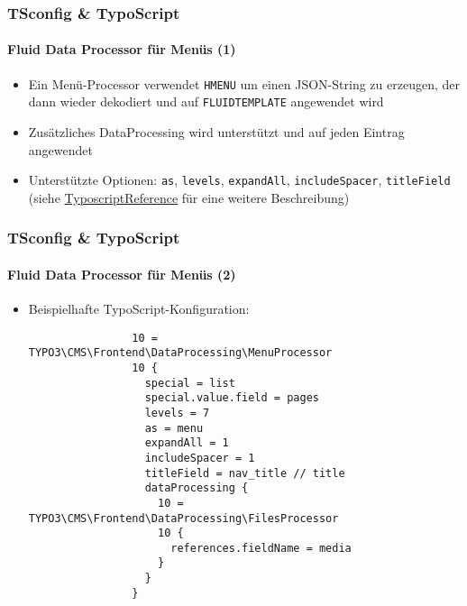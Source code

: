 \begin{frame}[fragile]
	\frametitle{TSconfig \& TypoScript}
	\framesubtitle{Fluid Data Processor für Menüs (1)}

	\begin{itemize}
		\item Ein Menü-Processor verwendet \texttt{HMENU} um einen JSON-String zu erzeugen, der dann wieder dekodiert und auf \texttt{FLUIDTEMPLATE} angewendet wird
		\item Zusätzliches DataProcessing wird unterstützt und auf jeden Eintrag angewendet
		\item Unterstützte Optionen: \texttt{as}, \texttt{levels}, \texttt{expandAll}, \texttt{includeSpacer},
			\texttt{titleField}
			(siehe \href{https://docs.typo3.org/typo3cms/TyposcriptReference/ContentObjects/Hmenu/Index.html}{TyposcriptReference} für eine weitere Beschreibung)
	\end{itemize}

\end{frame}

\begin{frame}[fragile]
	\frametitle{TSconfig \& TypoScript}
	\framesubtitle{Fluid Data Processor für Menüs (2)}

	\lstset{basicstyle=\tiny\ttfamily}

	\begin{itemize}
		\item Beispielhafte TypoScript-Konfiguration:

			\begin{lstlisting}
				10 = TYPO3\CMS\Frontend\DataProcessing\MenuProcessor
				10 {
				  special = list
				  special.value.field = pages
				  levels = 7
				  as = menu
				  expandAll = 1
				  includeSpacer = 1
				  titleField = nav_title // title
				  dataProcessing {
				    10 = TYPO3\CMS\Frontend\DataProcessing\FilesProcessor
				    10 {
				      references.fieldName = media
				    }
				  }
				}
			\end{lstlisting}

	\end{itemize}

\end{frame}

